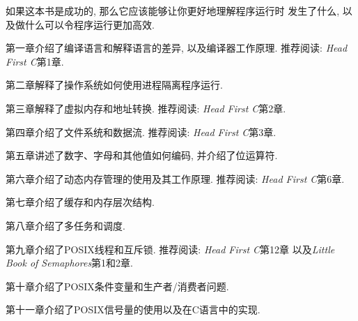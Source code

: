 \documentclass[12pt]{book}
\begin{document}
如果这本书是成功的, 那么它应该能够让你更好地理解程序运行时
发生了什么, 以及做什么可以令程序运行更加高效.

第一章介绍了编译语言和解释语言的差异, 以及编译器工作原理.
推荐阅读: {\it Head First C}第1章.

第二章解释了操作系统如何使用进程隔离程序运行.

第三章解释了虚拟内存和地址转换.
推荐阅读: {\it Head First C}第2章.

第四章介绍了文件系统和数据流.
推荐阅读: {\it Head First C}第3章.

第五章讲述了数字、字母和其他值如何编码, 并介绍了位运算符.

第六章介绍了动态内存管理的使用及其工作原理.
推荐阅读: {\it Head First C}第6章.

第七章介绍了缓存和内存层次结构.

第八章介绍了多任务和调度.

第九章介绍了POSIX线程和互斥锁.
推荐阅读: {\it Head First C}第12章
以及{\it Little Book of Semaphores}第1和2章.

第十章介绍了POSIX条件变量和生产者/消费者问题.

第十一章介绍了POSIX信号量的使用以及在C语言中的实现.
\end{document}
